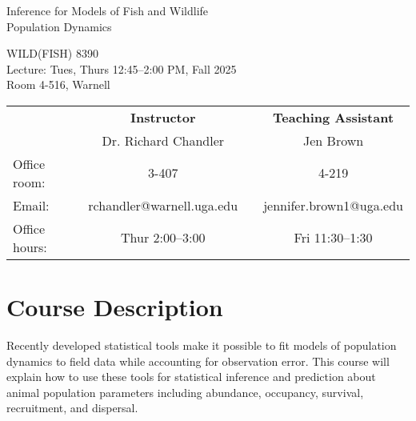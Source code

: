 \documentclass[12pt]{article}
\begin{document}
{\centering

{\Large \sc
  Inference for Models of Fish and Wildlife \\ Population Dynamics  
}
\vspace{6pt}

WILD(FISH) 8390  \\
Lecture: Tues, Thurs 12:45--2:00 PM, Fall 2025 \\
Room 4-516, Warnell \\


\normalsize

\vspace{12pt}

\begin{tabular}[h!]{lccc}
                     & \textbf{Instructor}       & \hspace{0.01cm} & \textbf{Teaching Assistant} \\
                     & Dr. Richard Chandler      &                 & Jen Brown                \\
Office room:         & 3-407                     &                 & 4-219                       \\
Email:               & rchandler@warnell.uga.edu &                 & jennifer.brown1@uga.edu       \\
Office hours:        & Thur 2:00--3:00           &                 & Fri 11:30--1:30             \\
\end{tabular}


}



\normalsize


\vspace{-2mm}
\section*{\normalsize Course Description}
\vspace{-4mm}
Recently developed statistical tools make it possible to fit models of
population dynamics to field data while accounting for observation
error. This course will explain how to use these tools for statistical
inference and prediction about animal population parameters including
abundance, occupancy, survival, recruitment, and dispersal.   
\end{document}
